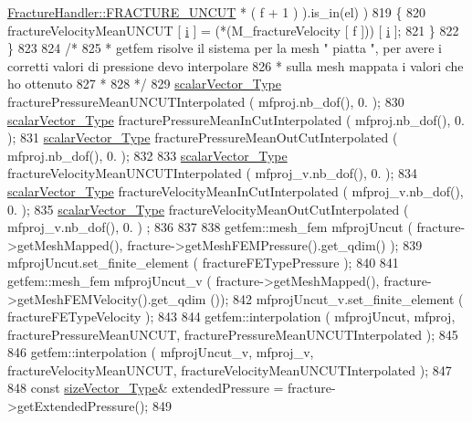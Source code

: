 \begin{DoxyCode}
      \hyperlink{classFractureHandler_a495ad4fc72d0c47c8f0424842f1153aaaa992cc3ad024a030ecd798dc319c95ac}{FractureHandler::FRACTURE\_UNCUT} * ( f + 1 ) ).is\_in(el) )
819             \{   
820                 fractureVelocityMeanUNCUT [ \hyperlink{matrici_8m_a6f6ccfcf58b31cb6412107d9d5281426}{i} ] = (*(M\_fractureVelocity [ f ])) [ 
      \hyperlink{matrici_8m_a6f6ccfcf58b31cb6412107d9d5281426}{i} ];
821             \}
822         \}
823         
824         \textcolor{comment}{/*}
825 \textcolor{comment}{         * getfem risolve il sistema per la mesh " piatta ", per avere i corretti valori di pressione devo
       interpolare}
826 \textcolor{comment}{         * sulla mesh mappata i valori che ho ottenuto}
827 \textcolor{comment}{         * }
828 \textcolor{comment}{         */}
829         \hyperlink{Core_8h_a4e75b5863535ba1dd79942de2846eff0}{scalarVector\_Type} fracturePressureMeanUNCUTInterpolated ( mfproj.nb\_dof(), 0. );
830         \hyperlink{Core_8h_a4e75b5863535ba1dd79942de2846eff0}{scalarVector\_Type} fracturePressureMeanInCutInterpolated ( mfproj.nb\_dof(), 0. );
831         \hyperlink{Core_8h_a4e75b5863535ba1dd79942de2846eff0}{scalarVector\_Type} fracturePressureMeanOutCutInterpolated ( mfproj.nb\_dof(), 0. );
832 
833         \hyperlink{Core_8h_a4e75b5863535ba1dd79942de2846eff0}{scalarVector\_Type} fractureVelocityMeanUNCUTInterpolated ( mfproj\_v.nb\_dof(), 0. );
834         \hyperlink{Core_8h_a4e75b5863535ba1dd79942de2846eff0}{scalarVector\_Type} fractureVelocityMeanInCutInterpolated ( mfproj\_v.nb\_dof(), 0. );
835         \hyperlink{Core_8h_a4e75b5863535ba1dd79942de2846eff0}{scalarVector\_Type} fractureVelocityMeanOutCutInterpolated ( mfproj\_v.nb\_dof(), 0. )
      ;
836 
837         
838         getfem::mesh\_fem mfprojUncut ( fracture->getMeshMapped(), fracture->getMeshFEMPressure().get\_qdim()
      );
839         mfprojUncut.set\_finite\_element ( fractureFETypePressure );
840 
841         getfem::mesh\_fem mfprojUncut\_v ( fracture->getMeshMapped(), fracture->getMeshFEMVelocity().get\_qdim
      ());
842         mfprojUncut\_v.set\_finite\_element ( fractureFETypeVelocity );
843 
844         getfem::interpolation ( mfprojUncut, mfproj, fracturePressureMeanUNCUT, 
      fracturePressureMeanUNCUTInterpolated );
845         
846         getfem::interpolation ( mfprojUncut\_v, mfproj\_v, fractureVelocityMeanUNCUT, 
      fractureVelocityMeanUNCUTInterpolated );
847 
848         \textcolor{keyword}{const} \hyperlink{Core_8h_a83c51913d041a5001e8683434c09857f}{sizeVector\_Type}& extendedPressure = fracture->getExtendedPressure();
849         

\end{DoxyCode}
